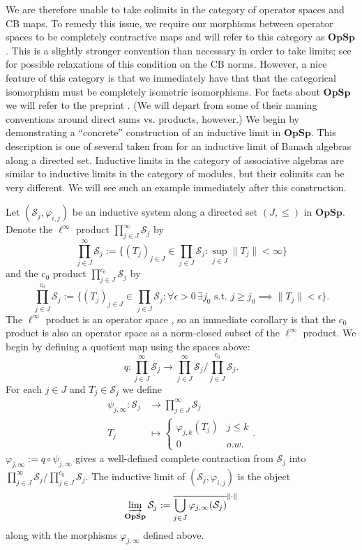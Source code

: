 \documentclass[12pt]{article}
\theoremstyle{definition}
\newenvironment{example}
  {\pushQED{\qed}\renewcommand{\qedsymbol}{\textcircled{\tiny E}}\examplex}
  {\popQED\endexamplex}
\newcommand{\mc}[1]{\mathcal{#1}}
\newcommand{\<}{\langle}
\renewcommand{\>}{\rangle}
\begin{document}
We are therefore unable to take colimits in the category of operator spaces and CB maps. To remedy this issue, we require our morphisms between operator spaces to be completely contractive maps and will refer to this category as $\textbf{OpSp}$. This is a slightly stronger convention than necessary in order to take limits; see \cite{daws} for possible relaxations of this condition on the CB norms. However, a nice feature of this category is that we immediately have that that the categorical isomorphism must be completely isometric isomorphisms. For facts about $\textbf{OpSp}$ we will refer to the preprint \cite{categoryopsp}. (We will depart from some of their naming conventions around direct sums vs. products, however.) We begin by demonstrating a ``concrete'' construction of an inductive limit in $\textbf{OpSp}$. This description is one of several taken from \cite{daws} for an inductive limit of Banach algebras along a directed set. Inductive limits in the category of associative algebras are similar to inductive limits in the category of modules, but their colimits can be very different. We will see such an example immediately after this construction.  

\begin{example}[``Concrete'' Construction]
Let $(\mc S_j, \varphi_{i,j})$ be an inductive system along a directed set $(J,\leq)$ in $\textbf{OpSp}$. Denote the $\ell^\infty$ product $\prod^\infty_{j \in J} \mc S_j$ by
\[
\prod^\infty_{j \in J} \mc S_j := \bigg\{ (T_j)_{j \in J}  \in \prod_{j \in J} \mc S_j : \sup_{j \in J} \|T_j\| < \infty\bigg\}
\]
and the $c_0$ product $\prod^{c_0}_{j \in J} \mc S_j$ by
\[
\prod^{c_0}_{j \in J} \mc S_j := \bigg\{ (T_j)_{j \in J}  \in \prod_{j \in J} \mc S_j : \forall \epsilon > 0 \, \exists j_0 \text{ s.t. } j\geq j_0 \implies \|T_j\| < \epsilon \bigg\}.
\]
The $\ell^\infty$ product is an operator space \cite[Proposition 4.11]{categoryopsp}, so an immediate corollary is that the $c_0$ product is also an operator space as a norm-closed subset of the $\ell^\infty$ product. We begin by defining a quotient map using the spaces above:
\[
q: \prod^\infty_{j \in J} \mc S_j \to {\prod^\infty_{j \in J} \mc S_j} \Big/ \prod^{c_0}_{j \in J} \mc S_j.
\]
For each $j \in J$ and $T_j \in \mc S_j$ we define 
\begin{align*}
\psi_{j,\infty}: \mc S_j &\to \prod^\infty_{j \in J} \mc S_j \\
T_j &\mapsto \begin{cases} \varphi_{j,k}(T_j) & j \leq k \\
0 & o.w.
\end{cases}.
\end{align*}
$\varphi_{j,\infty} := q \circ \psi_{j,\infty}$ gives a well-defined complete contraction from $\mc S_j$ into ${\prod^\infty_{j \in J} \mc S_j} \Big/ \prod^{c_0}_{j \in J} \mc S_j$. The inductive limit of $(\mc S_j, \varphi_{i,j})$ is the object  
\[
\varinjlim_{\bf{OpSp}} \mc S_j := \overline{\bigcup_{j \in J}\varphi_{j,\infty}(\mc S_j)}^{\|\cdot \|}
\]
along with the morphisms $\varphi_{j,\infty}$ defined above.
\end{example}
\end{document}

